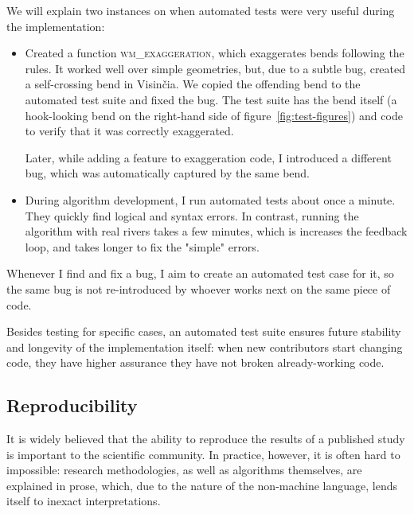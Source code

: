 \documentclass[a4paper]{article}
\begin{document}
We will explain two instances on when automated tests were very useful during
the implementation:
\begin{itemize}

    \item Created a function \textsc{wm\_exaggeration}, which exaggerates bends
      following the rules. It worked well over simple geometries, but, due to a
      subtle bug, created a self-crossing bend in Visinčia. We copied the
      offending bend to the automated test suite and fixed the bug. The test
      suite has the bend itself (a hook-looking bend on the right-hand side of
      figure~\ref{fig:test-figures}) and code to verify that it was correctly
      exaggerated.

        Later, while adding a feature to exaggeration code, I introduced a
        different bug, which was automatically captured by the same bend.

    \item During algorithm development, I run automated tests about once a
        minute. They quickly find logical and syntax errors. In contrast,
        running the algorithm with real rivers takes a few minutes, which is
        increases the feedback loop, and takes longer to fix the "simple"
        errors.

\end{itemize}

Whenever I find and fix a bug, I aim to create an automated test case for it,
so the same bug is not re-introduced by whoever works next on the same piece of
code.

Besides testing for specific cases, an automated test suite ensures future
stability and longevity of the implementation itself: when new contributors
start changing code, they have higher assurance they have not broken
already-working code.

\subsection{Reproducibility}
\label{sec:reproducing-the-paper}


It is widely believed that the ability to reproduce the results of a published
study is important to the scientific community. In practice, however, it is
often hard to impossible: research methodologies, as well as algorithms
themselves, are explained in prose, which, due to the nature of the non-machine
language, lends itself to inexact interpretations.
\end{document}
